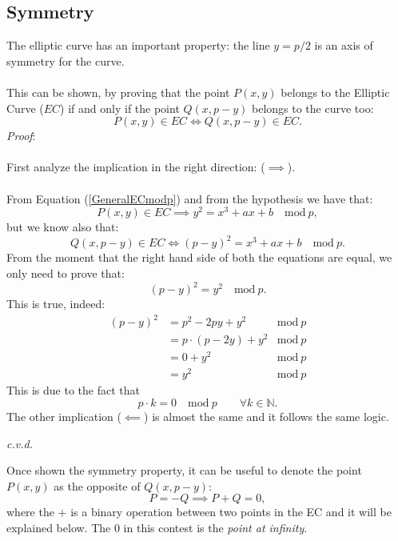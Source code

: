 \subsection{Symmetry}
The elliptic curve has an important property: the line $y=p/2$ is an axis of symmetry for the curve.
\\ \\
This can be shown, by proving that the point $P(x,y)$ belongs to the Elliptic Curve ($EC$) if and only if the point $Q(x,p-y)$ belongs to the curve too:
\begin{equation*}
P(x,y) \in EC \iff Q(x,p-y) \in EC.
\end{equation*}
\textit{Proof}:
\\ \\
First analyze the implication in the right direction: ($\implies $).
\\ \\
From Equation (\ref{GeneralECmodp}) and from the hypothesis we have that:
\begin{equation*}
P(x,y) \in EC \implies y^2=x^3+ax+b \quad \textrm{mod} \ p,
\end{equation*}
but we know also that: 
\begin{equation*}
Q(x,p-y) \in EC \iff (p-y)^2=x^3+ax+b \quad \textrm{mod} \ p.
\end{equation*}
From the moment that the right hand side of both the equations are equal, we only need to prove that:
\begin{equation*}
(p-y)^2=y^2 \quad \textrm{mod} \ p.
\end{equation*}
This is true, indeed:
\begin{align*}
(p-y)^2 & = p^2 -2py + y^2 &  \textrm{mod} \ p \\
& = p\cdot(p -2y) + y^2 &  \textrm{mod} \ p \\
& = 0+y^2 &  \textrm{mod} \ p \\
& = y^2 &  \textrm{mod} \ p
\end{align*}
This is due to the fact that 
\begin{equation*}
p\cdot k =0 \quad \textrm{mod} \ p \qquad \forall k\in \mathbb{N}.
\end{equation*}
The other implication ($\impliedby$) is almost the same and it follows the same logic.
\begin{flushright}
	\textit{c.v.d.}
\end{flushright}
Once shown the symmetry property, it can be useful to denote the point $P(x,y)$ as the opposite of $Q(x,p-y)$:
\begin{equation*}
P=-Q \implies P+Q=0,
\end{equation*}
where the $+$ is a  binary operation between two points in the EC and it will be explained below. The $0$ in this contest is the \textit{point at infinity}.

